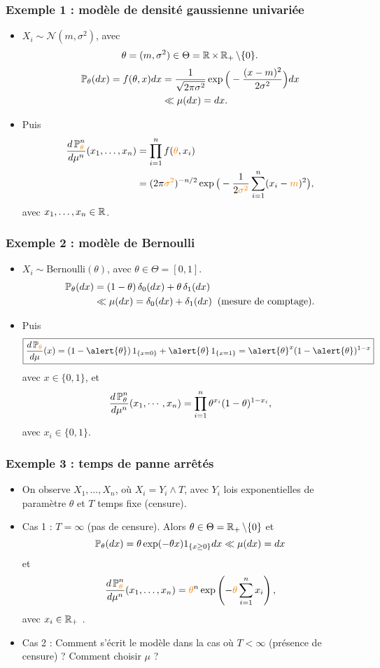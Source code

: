 \begin{frame}
\frametitle{Exemple 1 : modèle de densité gaussienne univariée}
\begin{itemize}
\item $X_i\sim {\mathcal N}(m,\sigma^2)$,
avec
$$\theta = (m,\sigma^2) \in \Theta = \operatorname{{\mathbb R}}\times \operatorname{{\mathbb R}}_+\setminus\{0\}.$$
\begin{align*}
\operatorname{{\mathbb P}}_\theta(dx) = f(\theta,x)dx & =\frac{1}{\sqrt{2\pi \sigma^2}}\exp\Big(-\frac{(x-m)^2}{2\sigma^2}\Big)dx \\
& \ll \mu(dx)=dx.
\end{align*}
\item Puis
\begin{align*}
\frac{d\PP_{\tco{\theta}}^n}{d\mu^n}(x_1,\ldots, x_n) & = \prod_{i = 1}^n f(\tco{\theta},x_i) \\
& =(2\pi \tco{\sigma^2})^{-n/2}\exp\big(-\frac{1}{2\tco{\sigma^2}}\sum_{i = 1}^n (x_i-\tco{m})^2\big),
\end{align*}
avec $x_1,\ldots,x_n \in \operatorname{{\mathbb R}}$.
\end{itemize}
\end{frame}

\begin{frame}
\frametitle{Exemple 2 :  modèle de Bernoulli}
\begin{itemize}
\item $X_i \sim \text{Bernoulli}(\theta)$, avec $\theta \in \Theta = [0,1]$.
\begin{align*}
\operatorname{{\mathbb P}}_\theta(dx)& = (1-\theta)\, \delta_{0}(dx) + \theta\, \delta_1(dx) \\
& \ll \mu(dx) = \delta_0(dx)+\delta_1(dx)\;\;\text{(mesure de comptage)}.
\end{align*}
\item Puis
$$\boxed{\frac{d\PP_{\tco{\theta}}}{d\mu}(x) = (1-\alert{\theta})\,1_{\{x=0\}}+\alert{\theta}\,1_{\{x=1\}} = \alert{\theta}^x(1-\alert{\theta})^{1-x}}$$
\alert{avec $x\in \{0,1\}$}, et
$$\frac{d\operatorname{{\mathbb P}}_\theta^n}{d\mu^n}(x_1,\cdots, x_n) = \prod_{i = 1}^n \theta^{x_i}(1-\theta)^{1-x_i},$$
\alert{avec $x_i \in \{0,1\}$}.
\end{itemize}
\end{frame}

\begin{frame}
\frametitle{Exemple 3 : temps de panne arrêtés}
\begin{itemize}
\item On observe $X_1,\ldots, X_n$, où $X_i = Y_i \wedge T$, avec $Y_i$ \alert{lois exponentielles} de paramètre $\theta$ et $T$ \alert{temps fixe} (censure).
\item Cas 1 : $T=\infty$ (pas de censure). Alors  $\theta \in \Theta = \operatorname{{\mathbb R}}_+\setminus \{0\}$ et
$$\operatorname{{\mathbb P}}_\theta(dx) = \theta \exp(-\theta x)1_{\{x \geq 0\}}dx \ll \mu(dx) = dx$$
et
$$
\frac{d\PP_{\tco{\theta}}^n}{d\mu^n}(x_1,\ldots,x_n) = \tco{\theta}^n \exp\left(-\tco{\theta} \sum_{i = 1}^n x_i\right),
$$
\alert{avec $x_i \in \operatorname{{\mathbb R}}_+$} .
\item Cas 2 : \alert{Comment s'écrit le modèle} dans la cas où $T<\infty$ (présence de censure) ? Comment choisir $\mu$ ?
\end{itemize}
\end{frame}






